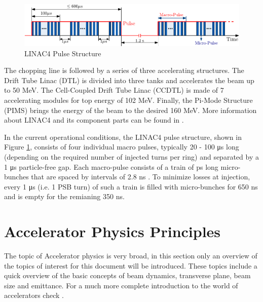 \begin{figure}[h]
    \centering
    \includegraphics[width=1.0\columnwidth]{Figure_Linac4PulseStructure/Linac4_PulseStruct.pdf}
    \caption{LINAC4 Pulse Structure }
    \label{fig:Linac4PulseStruct}
\end{figure}

The chopping line is followed by a series of three accelerating structures. The Drift Tube Linac (DTL) is divided into three tanks and accelerates the beam up to 50 \si[]{\mega \electronvolt}. The Cell-Coupled Drift Tube Linac (CCDTL) is made of 7 accelerating modules for top energy of 102 \si[]{\mega \electronvolt}. Finally, the Pi-Mode Structure (PIMS) brings the energy of the beam to the desired 160 \si[]{\mega\electronvolt}. More information about LINAC4 and its component parts can be found in \parencite*[]{ref:Linac4Technical}.  

In the current operational conditions, the LINAC4 pulse structure, shown in Figure \ref{fig:Linac4PulseStruct}, consists of four individual macro pulses, typically 20 - 100 \si[]{\micro \second} long (depending on the required number of injected turns per ring) and separated by a 1 \si[]{\micro \second} particle-free gap. Each macro-pulse consists of a train of \si[]{\pico \second} long micro-bunches that are spaced by intervals of 2.8 \si[]{\nano \second} \parencite*[]{ref:Linac4PulseStruct}. To minimize losses at injection, every 1 \si[]{\micro \second} (i.e. 1 PSB turn) of such a train is filled with micro-bunches for 650 \si[]{\nano \second} and is empty for the remianing 350 \si[]{\nano \second}.

\newpage

\section{Accelerator Physics Principles}
\label{sec:AccPhysPrinc}

The topic of Accelerator physics is very broad, in this section only an overview of the topics of interest for this document will be introduced. These topics include a quick overview of the basic concepts of beam dynamics, transverse plane, beam size and emittance. For a much more complete introduction to the world of accelerators check \parencite*[][]{ref:BookAccPhysics}.

